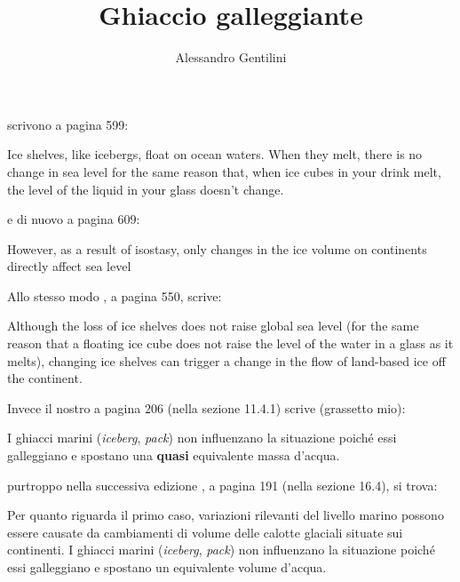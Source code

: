 \documentclass[a4paper]{article}
\begin{document}
\title{Ghiaccio galleggiante}
\author{Alessandro Gentilini}
\maketitle

\cite{ceccarelli_observation_1952}

\cite{grotzinger_understanding_2014} scrivono a pagina 599:

\begin{quoting}
    Ice shelves, like icebergs, float on ocean waters. When they melt,
    there is no change in sea level for the same reason that, when
    ice cubes in your drink melt, the level of the liquid in your glass
    doesn't change.
\end{quoting}

e di nuovo a pagina 609:

\begin{quoting}
However, as a result of isostasy, only changes in
the ice volume on continents directly affect sea level
\end{quoting}

Allo stesso modo \cite{hess_mcknights_2013}, a pagina 550, scrive:

\begin{quoting}
Although the loss of ice shelves does not raise global sea level 
(for the same reason that a floating ice cube does not raise the level of the water in a glass as it melts), 
changing ice shelves can trigger a change in the flow of land-based ice off the continent.
\end{quoting}

Invece il nostro \cite{bosellini_scienze_1986} a pagina 206 (nella sezione 11.4.1) scrive (grassetto mio):

\begin{quoting}
    I ghiacci marini (\textit{iceberg}, \textit{pack}) non influenzano la situazione poiché essi 
    galleggiano e spostano una \textbf{quasi} equivalente massa d'acqua.
\end{quoting}

purtroppo nella successiva edizione \cite{bosellini_scienze_1998}, a pagina 191 (nella sezione 16.4), si trova:

\begin{quoting}
Per quanto riguarda il primo caso, variazioni rilevanti del livello marino possono essere causate
da cambiamenti di volume delle calotte glaciali situate sui continenti.
I ghiacci marini (\textit{iceberg}, \textit{pack}) non influenzano la situazione poiché essi 
galleggiano e spostano un equivalente volume d'acqua.
\end{quoting}
\end{document}
